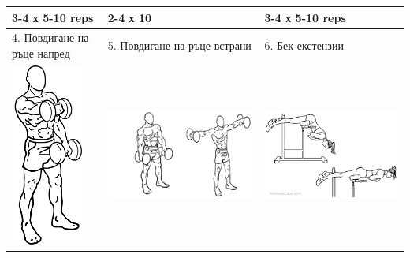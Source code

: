 \documentclass{article}
\begin{document}
\begin{tabular}{ | m{5cm} | m{5cm} | m{5cm} | }
3-4 х 5-10 reps &  2-4 х 10 &  3-4 х 5-10 reps \\
\hline
4. Повдигане на ръце напред & 5. Повдигане на ръце встрани & 6. Бек екстензии \\ 
\begin{minipage}{5cm} \includegraphics[width=\linewidth, height=60mm]{day_A_ex_5_Dumbbell-front-raises-2-1-1.png} \end{minipage} & 
\begin{minipage}{5cm} \includegraphics[width=\linewidth, height=60mm]{day_A_ex_6_Dumbbell-lateral-raises-2.png} \end{minipage} &
\begin{minipage}{5cm} \includegraphics[width=\linewidth, height=60mm]{day_A_ex_4_Back_Extensions.png} \end{minipage} \\

\end{tabular}
\end{document}
